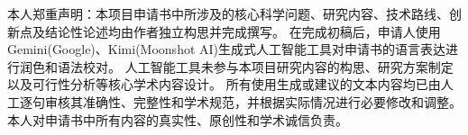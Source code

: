 本人郑重声明：本项目申请书中所涉及的核心科学问题、研究内容、技术路线、创新点及结论性论述均由作者独立构思并完成撰写。
在完成初稿后，申请人使用Gemini(Google)、Kimi(Moonshot AI)生成式人工智能工具对申请书的语言表达进行润色和语法校对。
人工智能工具未参与本项目研究内容的构思、研究方案制定以及可行性分析等核心学术内容设计。
所有使用生成或建议的文本内容均已由人工逐句审核其准确性、完整性和学术规范，并根据实际情况进行必要修改和调整。
本人对申请书中所有内容的真实性、原创性和学术诚信负责。

